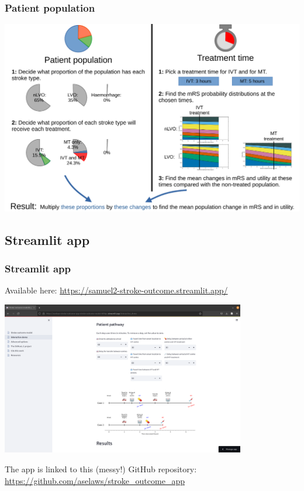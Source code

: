 \documentclass[xcolor={usenames,dvipsnames}]{beamer}
\newcommand{\smallurl}[1]{\textcolor{blue}{\fontsize{4pt}{4.8pt}\selectfont \url{#1}}}
\begin{document}


\begin{frame}
\frametitle{Patient population}

\begin{center} 
\includegraphics[width=\textwidth]{./images/population_method}
\end{center} 

\end{frame}



\subsection{Streamlit app} %
\begin{frame}
\frametitle{Streamlit app}


Available here: \textcolor{blue}{\url{https://samuel2-stroke-outcome.streamlit.app/}}

\vspace{0.5em}

\begin{center} 
\includegraphics[width=0.8\textwidth]{./images/Streamlit_pathway}
\end{center} 
  
\vspace{1em}

\tiny{The app is linked to this (messy!) GitHub repository:}
\smallurl{https://github.com/aselaws/stroke_outcome_app}

\end{frame}
\end{document}
